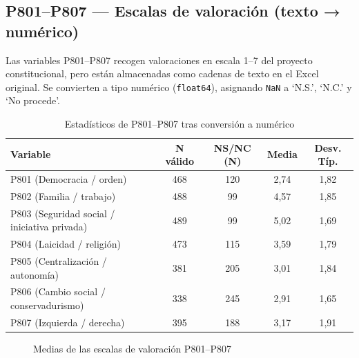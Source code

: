 \documentclass[12pt,a4paper]{article}
\newcommand{\thead}[1]{\cellcolor{tableheader}\color{white}\textbf{#1}}
\begin{document}
\subsection{P801--P807 — Escalas de valoración (texto → numérico)}

Las variables P801--P807 recogen valoraciones en escala 1--7 del proyecto constitucional, pero están almacenadas como cadenas de texto en el Excel original. Se convierten a tipo numérico (\texttt{float64}), asignando \texttt{NaN} a `N.S.', `N.C.' y `No procede'.

\begin{table}[H]
\centering
\renewcommand{\arraystretch}{1.3}
\begin{tabular}{lcccc}
\toprule
\thead{Variable} & \thead{N válido} & \thead{NS/NC (N)} & \thead{Media} & \thead{Desv. Típ.} \\
\midrule
P801 (Democracia / orden)                    & 468 & 120 & 2,74 & 1,82 \\
\rowcolor{tablerow}
P802 (Familia / trabajo)                     & 488 &  99 & 4,57 & 1,85 \\
P803 (Seguridad social / iniciativa privada) & 489 &  99 & 5,02 & 1,69 \\
\rowcolor{tablerow}
P804 (Laicidad / religión)                   & 473 & 115 & 3,59 & 1,79 \\
P805 (Centralización / autonomía)            & 381 & 205 & 3,01 & 1,84 \\
\rowcolor{tablerow}
P806 (Cambio social / conservadurismo)       & 338 & 245 & 2,91 & 1,65 \\
P807 (Izquierda / derecha)                   & 395 & 188 & 3,17 & 1,91 \\
\bottomrule
\end{tabular}
\caption{Estadísticos de P801--P807 tras conversión a numérico}
\end{table}

\begin{figure}[H]
\centering
{}
\caption{Medias de las escalas de valoración P801--P807}
\end{figure}
\end{document}

